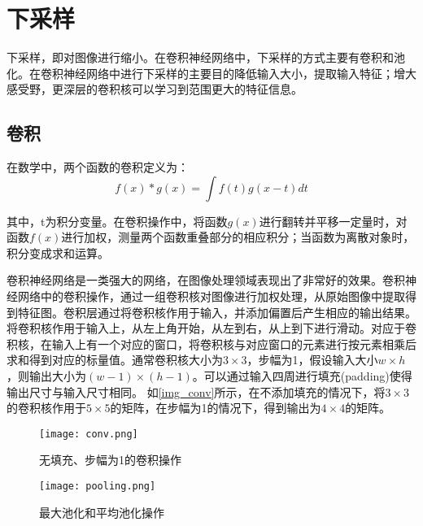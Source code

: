 \documentclass[AutoFakeBold]{LZUThesis}
\begin{document}
\section{下采样}
下采样，即对图像进行缩小。在卷积神经网络中，下采样的方式主要有卷积和池化。在卷积神经网络中进行下采样的主要目的降低输入大小，提取输入特征；增大感受野，更深层的卷积核可以学习到范围更大的特征信息。

\subsection{卷积}
在数学中，两个函数的卷积定义为：
\begin{equation}
    f(x)*g(x)=\int f(t)g(x-t)dt
\end{equation}

其中，t为积分变量。在卷积操作中，将函数$g(x)$进行翻转并平移一定量时，对函数$f(x)$进行加权，测量两个函数重叠部分的相应积分；当函数为离散对象时，积分变成求和运算。

卷积神经网络是一类强大的网络，在图像处理领域表现出了非常好的效果。卷积神经网络中的卷积操作，通过一组卷积核对图像进行加权处理，从原始图像中提取得到特征图。卷积层通过将卷积核作用于输入，并添加偏置后产生相应的输出结果。将卷积核作用于输入上，从左上角开始，从左到右，从上到下进行滑动。对应于卷积核，在输入上有一个对应的窗口，将卷积核与对应窗口的元素进行按元素相乘后求和得到对应的标量值。通常卷积核大小为$3\times 3$，步幅为1，假设输入大小$w\times h$，则输出大小为$(w-1)\times (h-1)$。可以通过输入四周进行填充(padding)使得输出尺寸与输入尺寸相同。
如\cref{img_conv}所示，在不添加填充的情况下，将$3\times 3$的卷积核作用于$5\times 5$的矩阵，在步幅为1的情况下，得到输出为$4\times 4$的矩阵。


\begin{figure}[htbp]
    \begin{minipage}[t]{0.5\linewidth}  %
        \centering
        \texttt{[image: conv.png]}
        \caption{无填充、步幅为1的卷积操作}
        \label{img_conv}
    \end{minipage}
    \hfill%
    \begin{minipage}[t]{0.5\linewidth}
        \centering
        \texttt{[image: pooling.png]}
        \caption{最大池化和平均池化操作}
        \label{img_pooling}
    \end{minipage}
\end{figure}

\end{document}
